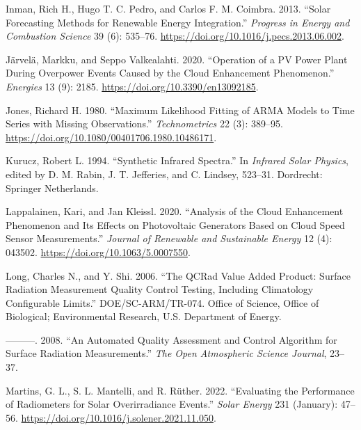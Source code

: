 \documentclass[
  preprint, 3p, authoryear]{article}
\newlength{\cslhangindent}
\newlength{\cslentryspacingunit} %
\newenvironment{CSLReferences}[2] %
 {%
  \setlength{\parindent}{0pt}
  \ifodd #1
  \let\oldpar\par
  \def\par{\hangindent=\cslhangindent\oldpar}
  \fi
  \setlength{\parskip}{#2\cslentryspacingunit}
 }%
 {}
\begin{document}
\begin{CSLReferences}{1}{0}
\leavevmode{}%
Inman, Rich H., Hugo T. C. Pedro, and Carlos F. M. Coimbra. 2013. {``Solar Forecasting Methods for Renewable Energy Integration.''} \emph{Progress in Energy and Combustion Science} 39 (6): 535--76. \url{https://doi.org/10.1016/j.pecs.2013.06.002}.

\leavevmode{}%
Järvelä, Markku, and Seppo Valkealahti. 2020. {``Operation of a {PV} Power Plant During Overpower Events Caused by the Cloud Enhancement Phenomenon.''} \emph{Energies} 13 (9): 2185. \url{https://doi.org/10.3390/en13092185}.

\leavevmode{}%
Jones, Richard H. 1980. {``Maximum Likelihood Fitting of {ARMA} Models to Time Series with Missing Observations.''} \emph{Technometrics} 22 (3): 389--95. \url{https://doi.org/10.1080/00401706.1980.10486171}.

\leavevmode{}%
Kurucz, Robert L. 1994. {``Synthetic Infrared Spectra.''} In \emph{Infrared Solar Physics}, edited by D. M. Rabin, J. T. Jefferies, and C. Lindsey, 523--31. Dordrecht: Springer Netherlands.

\leavevmode{}%
Lappalainen, Kari, and Jan Kleissl. 2020. {``Analysis of the Cloud Enhancement Phenomenon and Its Effects on Photovoltaic Generators Based on Cloud Speed Sensor Measurements.''} \emph{Journal of Renewable and Sustainable Energy} 12 (4): 043502. \url{https://doi.org/10.1063/5.0007550}.

\leavevmode{}%
Long, Charles N., and Y. Shi. 2006. {``The QCRad Value Added Product: Surface Radiation Measurement Quality Control Testing, Including Climatology Configurable Limits.''} DOE/SC-ARM/TR-074. Office of Science, Office of Biological; Environmental Research, U.S. Department of Energy.

\leavevmode{}%
---------. 2008. {``An Automated Quality Assessment and Control Algorithm for Surface Radiation Measurements.''} \emph{The Open Atmospheric Science Journal}, 23--37.

\leavevmode{}%
Martins, G. L., S. L. Mantelli, and R. Rüther. 2022. {``Evaluating the Performance of Radiometers for Solar Overirradiance Events.''} \emph{Solar Energy} 231 (January): 47--56. \url{https://doi.org/10.1016/j.solener.2021.11.050}.


\end{CSLReferences}
\end{document}
